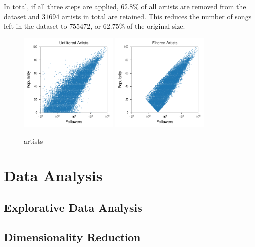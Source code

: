 \documentclass{article}
\begin{document}
In total, if all three steps are applied, $62.8\%$ of all artists are removed from the dataset and $31694$ artists in total are retained. This reduces the number of songs left in the dataset to $755472$, or $62.75\%$ of the original size.

\begin{figure}
  \centering
  \includegraphics[width=0.42\textwidth]{../figures/artists_unfiltered.pdf}
  \qquad
  \includegraphics[width=0.42\textwidth]{../figures/artists_filtered.pdf}
  \caption{artists}
  \label{fig:filtering}
\end{figure}

\section{Data Analysis}

\subsection{Explorative Data Analysis}

\subsection{Dimensionality Reduction}
\end{document}
